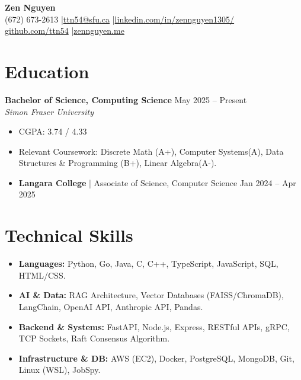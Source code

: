 \documentclass[10pt, letterpaper]{article}
\begin{document}
\pagestyle{empty} %

\begin{center}
    {\Huge \textbf{Zen Nguyen}} \\ \vspace{4pt}
    (672) 673-2613 \quad|\quad \href{mailto:ttn54@sfu.ca}{ttn54@sfu.ca} \quad|\quad \href{https://linkedin.com/in/zennguyen1305/}{linkedin.com/in/zennguyen1305/} \\ \vspace{2pt}
    \href{https://github.com/ttn54}{github.com/ttn54} \quad|\quad \href{https://zennguyen.me}{zennguyen.me}
\end{center}

\section*{Education}

\noindent
\textbf{Bachelor of Science, Computing Science} \hfill May 2025 -- Present \\
\textit{Simon Fraser University}
\begin{itemize}
    \item CGPA: 3.74 / 4.33
    \item Relevant Coursework: Discrete Math (A+), Computer Systems(A), Data Structures \& Programming (B+), Linear Algebra(A-).
    \item \textbf{Langara College} | Associate of Science, Computer Science \hfill Jan 2024 -- Apr 2025
\end{itemize}

\section*{Technical Skills}
\begin{itemize}
    \item \textbf{Languages:} Python, Go, Java, C, C++, TypeScript, JavaScript, SQL, HTML/CSS.
    \item \textbf{AI \& Data:} RAG Architecture, Vector Databases (FAISS/ChromaDB), LangChain, OpenAI API, Anthropic API, Pandas.
    \item \textbf{Backend \& Systems:} FastAPI, Node.js, Express, RESTful APIs, gRPC, TCP Sockets, Raft Consensus Algorithm.
    \item \textbf{Infrastructure \& DB:} AWS (EC2), Docker, PostgreSQL, MongoDB, Git, Linux (WSL), JobSpy.
\end{itemize}
\end{document}

